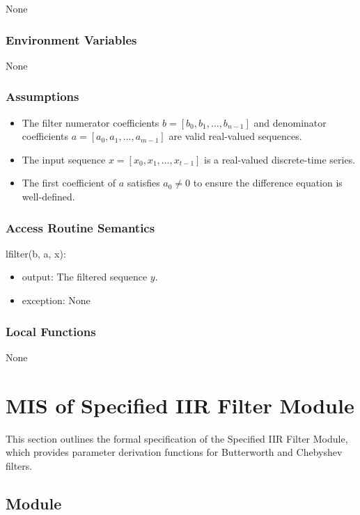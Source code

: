 \documentclass[12pt, titlepage]{article}
\begin{document}
None

\subsubsection{Environment Variables}

None

\subsubsection{Assumptions}

\begin{itemize}
\item The filter numerator coefficients $b = [b_0, b_1, \dots, b_{n-1}]$ and
denominator coefficients $a = [a_0, a_1, \dots, a_{m-1}]$ are valid real-valued
sequences.
\item The input sequence $x = [x_0, x_1, \dots, x_{t-1}]$ is a real-valued
discrete-time series.
\item The first coefficient of $a$ satisfies $a_0 \neq 0$ to ensure the
difference equation is well-defined.
\end{itemize}

\subsubsection{Access Routine Semantics}

\noindent lfilter(b, a, x):
\begin{itemize}
\item output: The filtered sequence $y$.
\item exception: None
\end{itemize}

\subsubsection{Local Functions}

None


\section{MIS of Specified IIR Filter Module} \label{MIS_SIIR}

This section outlines the formal specification of the Specified IIR Filter
Module, which provides parameter derivation functions for Butterworth and
Chebyshev filters.

\subsection{Module}
\end{document}

